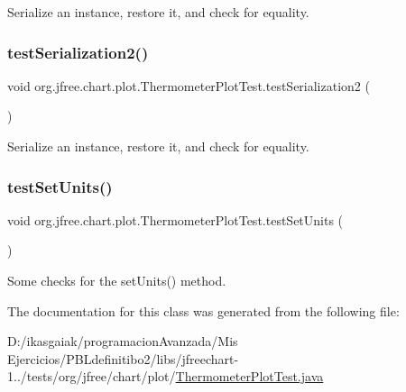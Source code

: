 Serialize an instance, restore it, and check for equality. \mbox{\label{classorg_1_1jfree_1_1chart_1_1plot_1_1_thermometer_plot_test_aa5bb25f82e9edd9248edec1c56b03859}} 
\subsubsection{\texorpdfstring{test\+Serialization2()}{testSerialization2()}}
{\footnotesize\ttfamily void org.\+jfree.\+chart.\+plot.\+Thermometer\+Plot\+Test.\+test\+Serialization2 (\begin{DoxyParamCaption}{ }\end{DoxyParamCaption})}

Serialize an instance, restore it, and check for equality. \mbox{\label{classorg_1_1jfree_1_1chart_1_1plot_1_1_thermometer_plot_test_af9789bd23c4c3130a3e602f5fee97c2b}} 
\subsubsection{\texorpdfstring{test\+Set\+Units()}{testSetUnits()}}
{\footnotesize\ttfamily void org.\+jfree.\+chart.\+plot.\+Thermometer\+Plot\+Test.\+test\+Set\+Units (\begin{DoxyParamCaption}{ }\end{DoxyParamCaption})}

Some checks for the set\+Units() method. 

The documentation for this class was generated from the following file\+:\begin{DoxyCompactItemize}
\item 
D\+:/ikasgaiak/programacion\+Avanzada/\+Mis Ejercicios/\+P\+B\+Ldefinitibo2/libs/jfreechart-\/1../tests/org/jfree/chart/plot/\mbox{\hyperlink{_thermometer_plot_test_8java}{Thermometer\+Plot\+Test.\+java}}\end{DoxyCompactItemize}
